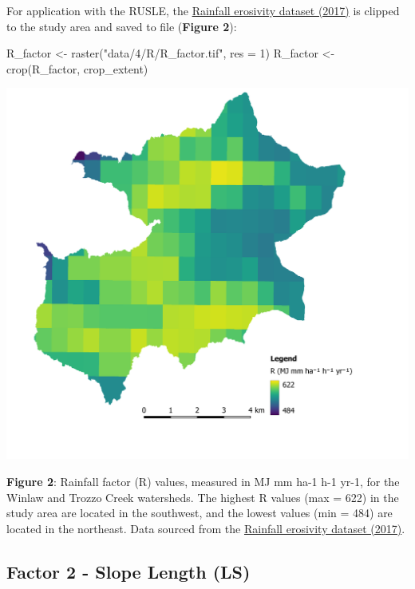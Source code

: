 \documentclass[
]{article}
\newenvironment{Shaded}{\begin{snugshade}}{\end{snugshade}}
\newcommand{\AttributeTok}[1]{\textcolor[rgb]{0.77,0.63,0.00}{#1}}
\newcommand{\DecValTok}[1]{\textcolor[rgb]{0.00,0.00,0.81}{#1}}
\newcommand{\FunctionTok}[1]{\textcolor[rgb]{0.00,0.00,0.00}{#1}}
\newcommand{\NormalTok}[1]{#1}
\newcommand{\OtherTok}[1]{\textcolor[rgb]{0.56,0.35,0.01}{#1}}
\newcommand{\StringTok}[1]{\textcolor[rgb]{0.31,0.60,0.02}{#1}}
\begin{document}
For application with the RUSLE, the \href{https://esdac.jrc.ec.europa.eu/content/global-rainfall-erosivity\#tabs-0-description=1}{Rainfall erosivity dataset (2017)} is clipped to the study area and saved to file (\textbf{Figure 2}):

\begin{Shaded}
\begin{Highlighting}[]
\NormalTok{R\_factor }\OtherTok{\textless{}{-}} \FunctionTok{raster}\NormalTok{(}\StringTok{"data/4/R/R\_factor.tif"}\NormalTok{,  }\AttributeTok{res =} \DecValTok{1}\NormalTok{)}
\NormalTok{R\_factor }\OtherTok{\textless{}{-}} \FunctionTok{crop}\NormalTok{(R\_factor, crop\_extent)}
\end{Highlighting}
\end{Shaded}

\includegraphics[width=1\textwidth,height=\textheight]{img/r_factor.png}

\textbf{Figure 2}: Rainfall factor (R) values, measured in MJ mm ha-1 h-1 yr-1, for the Winlaw and Trozzo Creek watersheds. The highest R values (max = 622) in the study area are located in the southwest, and the lowest values (min = 484) are located in the northeast. Data sourced from the \href{https://esdac.jrc.ec.europa.eu/content/global-rainfall-erosivity\#tabs-0-description=1}{Rainfall erosivity dataset (2017)}.

\hypertarget{sec-factor-2}{%
\subsection*{Factor 2 - Slope Length (LS)}\label{sec-factor-2}}
\end{document}
